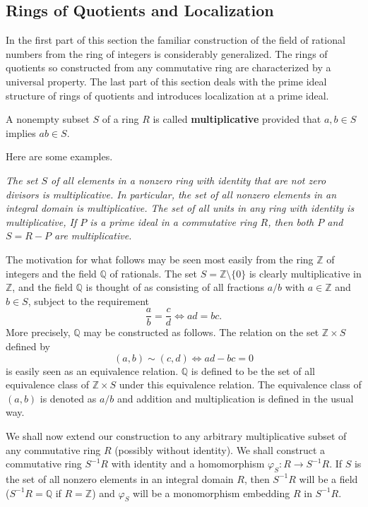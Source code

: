 \subsection{Rings of Quotients and Localization}
In the first part of this section the familiar construction of the field of rational numbers from the ring of integers is considerably generalized. The rings of quotients so constructed from any commutative ring are characterized by a universal property. The last part of this section deals with the prime ideal structure of rings of quotients and introduces localization at a prime ideal.\par
\begin{definition}
A nonempty subset $S$ of a ring $R$ is called \textbf{multiplicative} provided that $a,b\in S$ implies $ab\in S$.
\end{definition}
Here are some examples.
\begin{example}\em
The set $S$ of all elements in a nonzero ring with identity that are not zero divisors is multiplicative. In particular, the set of all nonzero elements in an integral domain is multiplicative. The set of all units in any ring with identity is multiplicative, If $P$ is a prime ideal in a commutative ring $R$, then both $P$ and $S=R-P$ are multiplicative.
\end{example}
The motivation for what follows may be seen most easily from the ring $\mathbb{Z}$ of integers and the field $\mathbb{Q}$ of rationals. The set $S=\mathbb{Z}\setminus\{0\}$ is clearly multiplicative in $\mathbb{Z}$, and the field $\mathbb{Q}$ is thought of as consisting of all fractions $a/b$ with $a\in\mathbb{Z}$ and $b\in S$, subject to the requirement 
$$
\frac{a}{b}=\frac{c}{d}\Leftrightarrow ad=bc.
$$
More precisely, $\mathbb{Q}$ may be constructed as follows. The relation on the set $\mathbb{Z}\times S$ defined by 
$$
\left( a,b \right) \sim \left( c,d \right) \Leftrightarrow ad-bc=0
$$
is easily seen as an equivalence relation. $\mathbb{Q}$ is defined to be the set of all equivalence class of $\mathbb{Z}\times S$ under this equivalence relation. The equivalence class of $(a,b)$ is denoted as $a/b$ and addition and multiplication is defined in the usual way.\par
We shall now extend our construction to any arbitrary multiplicative subset of any commutative ring $R$ (possibly without identity). We shall construct a commutative ring $S^{-1}R$ with identity and a homomorphism $\varphi_S:R\to S^{-1}R$. If $S$ is the set of all nonzero elements in an integral domain $R$, then $S^{-1}R$ will be a field ($S^{-1}R=\mathbb{Q}$ if $R=\mathbb{Z}$) and $\varphi_S$ will be a monomorphism embedding $R$ in $S^{-1}R$.

